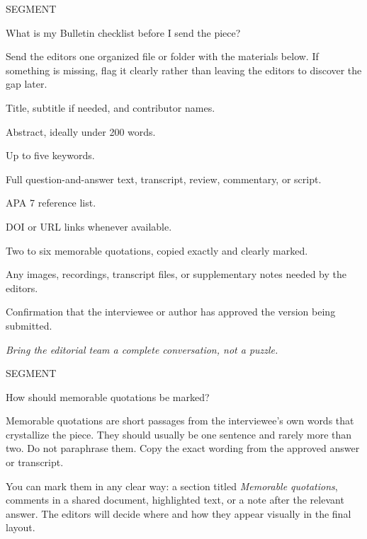 \documentclass[11pt]{article}
\newcommand{\GuideSansLight}{\sffamily}
\newcommand{\GuideSansRegular}{\sffamily}
\newcommand{\GuideSansLightItalic}{\sffamily\itshape}
\newcommand{\GuideSerif}{\rmfamily}
\newcounter{guideprompt}
\newcommand{\guidePrompt}[1]{%
  \Needspace{7\baselineskip}%
  \stepcounter{guideprompt}%
  \par\vspace{1.25em}%
  {\GuideSansLight\fontsize{9}{11}\selectfont\color{aliusgray}\MakeUppercase{Segment \theguideprompt}}\par
  {\GuideSansRegular\fontsize{17}{21}\selectfont\color{aliusgreen}#1\par}
  \vspace{0.35em}
}
\newenvironment{guideAnswerBlock}
  {\begingroup\GuideSerif\fontsize{12.4}{16.8}\selectfont\setlength{\parskip}{0.55em}\color{black}}
  {\par\endgroup}
\newcommand{\guideInterviewQuote}[1]{%
  \Needspace{6\baselineskip}%
  \par\vspace{0.85em}
  \begin{center}
    \begin{minipage}{0.9\textwidth}
      \centering
      {\GuideSansLightItalic\fontsize{15.5}{20}\selectfont\color{aliusgray}#1}
    \end{minipage}
  \end{center}
  \vspace{0.35em}
}
\begin{document}
\guidePrompt{What is my Bulletin checklist before I send the piece?}
\begin{guideAnswerBlock}
Send the editors one organized file or folder with the materials below. If something is missing, flag it clearly rather than leaving the editors to discover the gap later.

\begin{guideChecklist}
\item Title, subtitle if needed, and contributor names.
\item Abstract, ideally under 200 words.
\item Up to five keywords.
\item Full question-and-answer text, transcript, review, commentary, or script.
\item APA 7 reference list.
\item DOI or URL links whenever available.
\item Two to six memorable quotations, copied exactly and clearly marked.
\item Any images, recordings, transcript files, or supplementary notes needed by the editors.
\item Confirmation that the interviewee or author has approved the version being submitted.
\end{guideChecklist}
\end{guideAnswerBlock}

\guideInterviewQuote{Bring the editorial team a complete conversation, not a puzzle.}

\guidePrompt{How should memorable quotations be marked?}
\begin{guideAnswerBlock}
Memorable quotations are short passages from the interviewee's own words that crystallize the piece. They should usually be one sentence and rarely more than two. Do not paraphrase them. Copy the exact wording from the approved answer or transcript.

You can mark them in any clear way: a section titled \emph{Memorable quotations}, comments in a shared document, highlighted text, or a note after the relevant answer. The editors will decide where and how they appear visually in the final layout.
\end{guideAnswerBlock}
\end{document}

